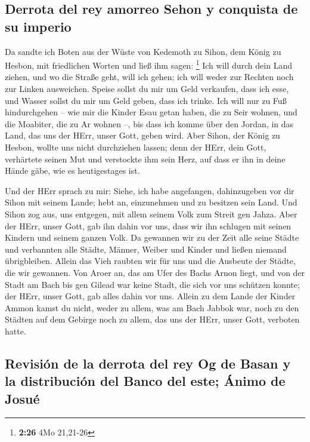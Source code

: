 \hypertarget{derrota-del-rey-amorreo-sehon-y-conquista-de-su-imperio}{%
\subsection{Derrota del rey amorreo Sehon y conquista de su
imperio}\label{derrota-del-rey-amorreo-sehon-y-conquista-de-su-imperio}}

 Da sandte ich Boten aus der Wüste von Kedemoth zu Sihon,
dem König zu Hesbon, mit friedlichen Worten und ließ ihm sagen:
\footnote{\textbf{2:26} 4Mo 21,21-26}  Ich will durch
dein Land ziehen, und wo die Straße geht, will ich gehen; ich will weder
zur Rechten noch zur Linken ausweichen.  Speise sollst du
mir um Geld verkaufen, dass ich esse, und Wasser sollst du mir um Geld
geben, dass ich trinke. Ich will nur zu Fuß hindurchgehen --
 wie mir die Kinder Esau getan haben, die zu Seir wohnen,
und die Moabiter, die zu Ar wohnen --, bis dass ich komme über den
Jordan, in das Land, das uns der HErr, unser Gott, geben wird.
 Aber Sihon, der König zu Hesbon, wollte uns nicht
durchziehen lassen; denn der HErr, dein Gott, verhärtete seinen Mut und
verstockte ihm sein Herz, auf dass er ihn in deine Hände gäbe, wie es
heutigestages ist.

 Und der HErr sprach zu mir: Siehe, ich habe angefangen,
dahinzugeben vor dir Sihon mit seinem Lande; hebt an, einzunehmen und zu
besitzen sein Land.  Und Sihon zog aus, uns entgegen, mit
allem seinem Volk zum Streit gen Jahza.  Aber der HErr,
unser Gott, gab ihn dahin vor uns, dass wir ihn schlugen mit seinen
Kindern und seinem ganzen Volk.  Da gewannen wir zu der
Zeit alle seine Städte und verbannten alle Städte, Männer, Weiber und
Kinder und ließen niemand übrigbleiben.  Allein das Vieh
raubten wir für uns und die Ausbeute der Städte, die wir gewannen.
 Von Aroer an, das am Ufer des Bachs Arnon liegt, und von
der Stadt am Bach bis gen Gilead war keine Stadt, die sich vor uns
schützen konnte; der HErr, unser Gott, gab alles dahin vor uns.
 Allein zu dem Lande der Kinder Ammon kamst du nicht,
weder zu allem, was am Bach Jabbok war, noch zu den Städten auf dem
Gebirge noch zu allem, das uns der HErr, unser Gott, verboten hatte.

\hypertarget{revisiuxf3n-de-la-derrota-del-rey-og-de-basan-y-la-distribuciuxf3n-del-banco-del-este-uxe1nimo-de-josuuxe9}{%
\subsection{Revisión de la derrota del rey Og de Basan y la distribución
del Banco del este; Ánimo de
Josué}\label{revisiuxf3n-de-la-derrota-del-rey-og-de-basan-y-la-distribuciuxf3n-del-banco-del-este-uxe1nimo-de-josuuxe9}}

